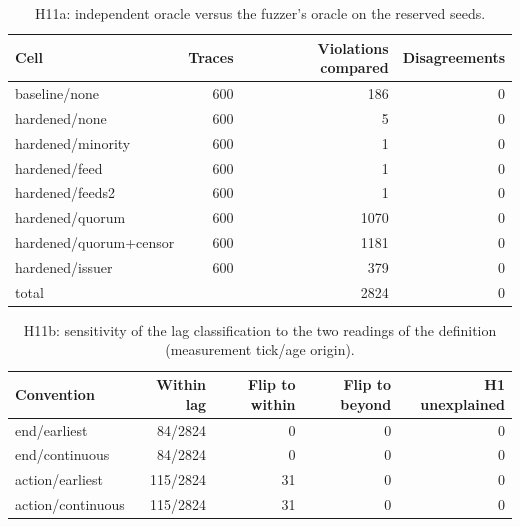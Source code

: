 \begin{table}[t]
\centering\small
\caption{H11a: independent oracle versus the fuzzer's oracle on the reserved seeds.}
\label{tab:h11}
\begin{tabular}{lrrr}
\toprule
Cell & Traces & Violations compared & Disagreements \\
\midrule
baseline/none & 600 & 186 & 0 \\
hardened/none & 600 & 5 & 0 \\
hardened/minority & 600 & 1 & 0 \\
hardened/feed & 600 & 1 & 0 \\
hardened/feeds2 & 600 & 1 & 0 \\
hardened/quorum & 600 & 1070 & 0 \\
hardened/quorum+censor & 600 & 1181 & 0 \\
hardened/issuer & 600 & 379 & 0 \\
total &  & 2824 & 0 \\
\bottomrule
\end{tabular}
\end{table}

\begin{table}[t]
\centering\small
\caption{H11b: sensitivity of the lag classification to the two readings of the definition (measurement tick/age origin).}
\label{tab:h11b}
\begin{tabular}{lrrrr}
\toprule
Convention & Within lag & Flip to within & Flip to beyond & H1 unexplained \\
\midrule
end/earliest & 84/2824 & 0 & 0 & 0 \\
end/continuous & 84/2824 & 0 & 0 & 0 \\
action/earliest & 115/2824 & 31 & 0 & 0 \\
action/continuous & 115/2824 & 31 & 0 & 0 \\
\bottomrule
\end{tabular}
\end{table}
